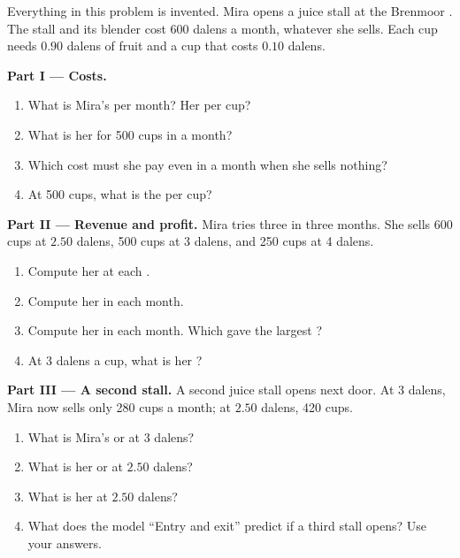 \begin{problem}
\label{pb:g7:firms:1}
Everything in this problem is invented. Mira opens a juice stall at the Brenmoor . The
stall and its blender cost 600 dalens a month, whatever she sells. Each cup needs $0.90$ dalens of
fruit and a cup that costs $0.10$ dalens.

\medskip
\noindent\textbf{Part I --- Costs.}
\begin{enumerate}
  \item What is Mira's  per month? Her  per cup?
  \item What is her  for 500 cups in a month?
  \item Which cost must she pay even in a month when she sells nothing?
  \item At 500 cups, what is the  per cup?
\end{enumerate}

\medskip
\noindent\textbf{Part II --- Revenue and profit.} Mira tries three  in three months. She
sells 600 cups at $2.50$ dalens, 500 cups at 3 dalens, and 250 cups at 4 dalens.
\begin{enumerate}[resume]
  \item Compute her  at each .
  \item Compute her  in each month.
  \item Compute her  in each month. Which  gave the largest ?
  \item At 3 dalens a cup, what is her ?
\end{enumerate}

\medskip
\noindent\textbf{Part III --- A second stall.} A second juice stall opens next door. At 3
dalens, Mira now sells only 280 cups a month; at $2.50$ dalens, 420 cups.
\begin{enumerate}[resume]
  \item What is Mira's  or  at 3 dalens?
  \item What is her  or  at $2.50$ dalens?
  \item What is her  at $2.50$ dalens?
  \item What does the model ``Entry and exit'' predict if a third stall opens? Use your answers.
\end{enumerate}
\end{problem}
